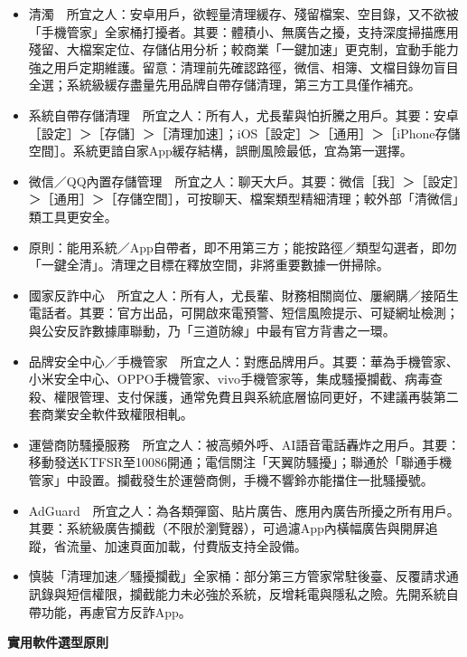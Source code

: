 \begin{itemize}
  \item 清濁　所宜之人：安卓用戶，欲輕量清理緩存、殘留檔案、空目錄，又不欲被「手機管家」全家桶打擾者。其要：體積小、無廣告之擾，支持深度掃描應用殘留、大檔案定位、存儲佔用分析；較商業「一鍵加速」更克制，宜動手能力強之用戶定期維護。留意：清理前先確認路徑，微信、相簿、文檔目錄勿盲目全選；系統級緩存盡量先用品牌自帶存儲清理，第三方工具僅作補充。
  \item 系統自帶存儲清理　所宜之人：所有人，尤長輩與怕折騰之用戶。其要：安卓［設定］＞［存儲］＞［清理加速］；iOS［設定］＞［通用］＞［iPhone存儲空間］。系統更諳自家App緩存結構，誤刪風險最低，宜為第一選擇。
  \item 微信／QQ內置存儲管理　所宜之人：聊天大戶。其要：微信［我］＞［設定］＞［通用］＞［存儲空間］，可按聊天、檔案類型精細清理；較外部「清微信」類工具更安全。
  \item 原則：能用系統／App自帶者，即不用第三方；能按路徑／類型勾選者，即勿「一鍵全清」。清理之目標在釋放空間，非將重要數據一併掃除。
\end{itemize}


\begin{itemize}
  \item 國家反詐中心　所宜之人：所有人，尤長輩、財務相關崗位、屢網購／接陌生電話者。其要：官方出品，可開啟來電預警、短信風險提示、可疑網址檢測；與公安反詐數據庫聯動，乃「三道防線」中最有官方背書之一環。
  \item 品牌安全中心／手機管家　所宜之人：對應品牌用戶。其要：華為手機管家、小米安全中心、OPPO手機管家、vivo手機管家等，集成騷擾攔截、病毒查殺、權限管理、支付保護，通常免費且與系統底層協同更好，不建議再裝第二套商業安全軟件致權限相軋。
  \item 運營商防騷擾服務　所宜之人：被高頻外呼、AI語音電話轟炸之用戶。其要：移動發送KTFSR至10086開通；電信關注「天翼防騷擾」；聯通於「聯通手機管家」中設置。攔截發生於運營商側，手機不響鈴亦能擋住一批騷擾號。
  \item AdGuard　所宜之人：為各類彈窗、貼片廣告、應用內廣告所擾之所有用戶。其要：系統級廣告攔截（不限於瀏覽器），可過濾App內橫幅廣告與開屏追蹤，省流量、加速頁面加載，付費版支持全設備。
  \item 慎裝「清理加速／騷擾攔截」全家桶：部分第三方管家常駐後臺、反覆請求通訊錄與短信權限，攔截能力未必強於系統，反增耗電與隱私之險。先開系統自帶功能，再慮官方反詐App。
\end{itemize}

\textbf{實用軟件選型原則}\par

